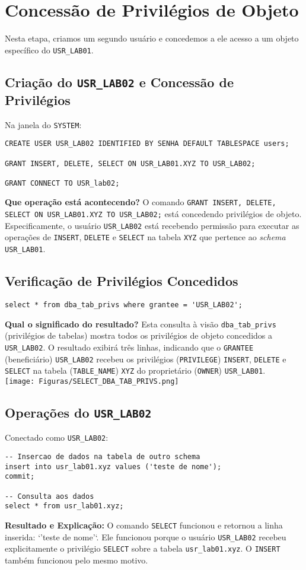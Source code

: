 \documentclass[a4paper, 12pt]{article}
\begin{document}
\section{Concessão de Privilégios de Objeto}
Nesta etapa, criamos um segundo usuário e concedemos a ele acesso a um objeto específico do \texttt{USR\_LAB01}.

\subsection{Criação do \texttt{USR\_LAB02} e Concessão de Privilégios}
Na janela do \texttt{SYSTEM}:
\begin{lstlisting}
CREATE USER USR_LAB02 IDENTIFIED BY SENHA DEFAULT TABLESPACE users;

GRANT INSERT, DELETE, SELECT ON USR_LAB01.XYZ TO USR_LAB02;

GRANT CONNECT TO USR_lab02;
\end{lstlisting}
\textbf{Que operação está acontecendo?} O comando \texttt{GRANT INSERT, DELETE, SELECT ON USR\_LAB01.XYZ TO USR\_LAB02;} está concedendo privilégios de objeto. Especificamente, o usuário \texttt{USR\_LAB02} está recebendo permissão para executar as operações de \texttt{INSERT}, \texttt{DELETE} e \texttt{SELECT} na tabela \texttt{XYZ} que pertence ao \textit{schema} \texttt{USR\_LAB01}.

\subsection{Verificação de Privilégios Concedidos}
\begin{lstlisting}
select * from dba_tab_privs where grantee = 'USR_LAB02';
\end{lstlisting}
\textbf{Qual o significado do resultado?} Esta consulta à visão \texttt{dba\_tab\_privs} (privilégios de tabelas) mostra todos os privilégios de objeto concedidos a \texttt{USR\_LAB02}. O resultado exibirá três linhas, indicando que o \texttt{GRANTEE} (beneficiário) \texttt{USR\_LAB02} recebeu os privilégios (\texttt{PRIVILEGE}) \texttt{INSERT}, \texttt{DELETE} e \texttt{SELECT} na tabela (\texttt{TABLE\_NAME}) \texttt{XYZ} do proprietário (\texttt{OWNER}) \texttt{USR\_LAB01}.\\
\texttt{[image: Figuras/SELECT\_DBA\_TAB\_PRIVS.png]}

\subsection{Operações do \texttt{USR\_LAB02}}
Conectado como \texttt{USR\_LAB02}:
\begin{lstlisting}
-- Insercao de dados na tabela de outro schema 
insert into usr_lab01.xyz values ('teste de nome');
commit;

-- Consulta aos dados
select * from usr_lab01.xyz;
\end{lstlisting}
\textbf{Resultado e Explicação:} O comando \texttt{SELECT} funcionou e retornou a linha inserida: `'teste de nome'`. Ele funcionou porque o usuário \texttt{USR\_LAB02} recebeu explicitamente o privilégio \texttt{SELECT} sobre a tabela \texttt{usr\_lab01.xyz}. O \texttt{INSERT} também funcionou pelo mesmo motivo.
\end{document}
